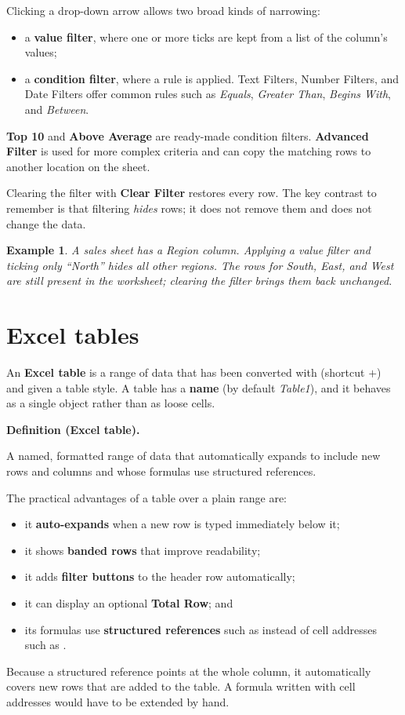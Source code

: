 \documentclass[11pt]{article}
\newtheorem{example}{Example}[section]
\newenvironment{definitionbox}[1]{%
  \par\noindent\textbf{Definition (#1).}\ \itshape
}{\par\vspace{0.3em}}
\begin{document}
Clicking a drop-down arrow allows two broad kinds of narrowing:
\begin{itemize}
  \item a \textbf{value filter}, where one or more ticks are kept from a list of
    the column's values;
  \item a \textbf{condition filter}, where a rule is applied. Text Filters,
    Number Filters, and Date Filters offer common rules such as \textit{Equals},
    \textit{Greater Than}, \textit{Begins With}, and \textit{Between}.
\end{itemize}
\textbf{Top 10} and \textbf{Above Average} are ready-made condition filters.
\textbf{Advanced Filter} is used for more complex criteria and can copy the
matching rows to another location on the sheet.

Clearing the filter with \textbf{Clear Filter} restores every row. The key
contrast to remember is that filtering \emph{hides} rows; it does not remove
them and does not change the data.

\begin{example}
A sales sheet has a Region column. Applying a value filter and ticking only
``North'' hides all other regions. The rows for South, East, and West are still
present in the worksheet; clearing the filter brings them back unchanged.
\end{example}

\section{Excel tables}
An \textbf{Excel table} is a range of data that has been converted with
 (shortcut $+$) and given a table style. A
table has a \textbf{name} (by default \textit{Table1}), and it behaves as a
single object rather than as loose cells.

\begin{definitionbox}{Excel table}
A named, formatted range of data that automatically expands to include new
rows and columns and whose formulas use structured references.
\end{definitionbox}

The practical advantages of a table over a plain range are:
\begin{itemize}
  \item it \textbf{auto-expands} when a new row is typed immediately below it;
  \item it shows \textbf{banded rows} that improve readability;
  \item it adds \textbf{filter buttons} to the header row automatically;
  \item it can display an optional \textbf{Total Row}; and
  \item its formulas use \textbf{structured references} such as
     instead of cell addresses such as .
\end{itemize}
Because a structured reference points at the whole column, it automatically
covers new rows that are added to the table. A formula written with cell
addresses would have to be extended by hand.
\end{document}
